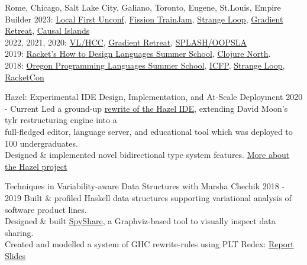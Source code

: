 \documentclass[10pt,a4paper]{article}
\begin{document}
    {Rome, Chicago, Salt Lake City, Galiano, Toronto, Eugene, St.Louis, Empire Builder}    
    {2023:
    \href{https://lu.ma/localfirstswunconf-stlouis}{Local First Unconf},
    \href{https://talk.fission.codes/t/trainjam-2023/4789}{Fission TrainJam},
    \href{https://www.thestrangeloop.com/}{Strange Loop},
    \href{https://www.gradientretreat.com/}{Gradient Retreat}, 
    \href{https://www.causalislands.com/}{Causal Islands} \\
    2022, 2021, 2020:
    \href{https://conf.researchr.org/home/vlhcc-2022}{VL/HCC},
    \href{https://www.gradientretreat.com/}{Gradient Retreat},
    \href{https://2021.splashcon.org/track/splash-2021-oopsla}{SPLASH/OOPSLA} \\
    2019:
    \href{https://school.racket-lang.org/2019/plan/}{Racket's How to Design Languages Summer School},
    \href{https://clojurenorth.com/}{Clojure North}. \\ 
    2018:
    \href{https://www.cs.uoregon.edu/research/summerschool/summer18/}{Oregon Programming Languages Summer School},
    \href{https://conf.researchr.org/home/icfp-2018}{ICFP},
    \href{https://www.thestrangeloop.com/2018/sessions.html}{Strange Loop},
    \href{https://con.racket-lang.org/2018/}{RacketCon}}
    

  \headedsubsection
    {Hazel: Experimental IDE Design, Implementation, and At-Scale Deployment}
    {2020 - Current}
    {Led a ground-up \href{https://hazel.org/build/haz3l-tests/}{rewrite of the Hazel IDE}, extending David Moon's tylr restructuring engine into a \\ full-fledged editor, language server, and educational tool which was deployed to 100 undergraduates.\\ Designed \& implemented novel bidirectional type system features. \href{https://hazel.org/}{More about the Hazel project}}

  \headedsubsection
    {Techniques in Variability-aware Data Structures with Marsha Chechik}
    {2018 - 2019}
    {Built \& profiled Haskell data structures supporting variational analysis of software product lines. \\
    Designed \& built \href{https://github.com/disconcision/spyshare}{SpyShare}, a Graphviz-based tool to visually inspect data sharing. \\
    Created and modelled a system of GHC rewrite-rules using PLT Redex:    \href{https://github.com/disconcision/vardatalab/blob/master/CSC495_TECHNIQUES_IN_VARIABILITY_AWARE_DATA_STRUCTURES.pdf}{Report} \sbull \href{https://github.com/disconcision/vardatalab/blob/master/CSC495_variational_data_structures_slides.pdf}{Slides}}
    
\end{document}
